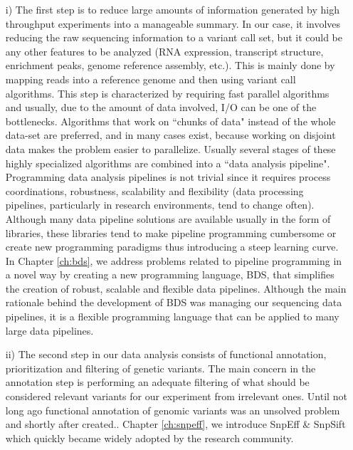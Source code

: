 \begin{itemize}
\item[i)] The first step is to reduce large amounts of information generated by high throughput experiments into a manageable summary. In our case, it involves reducing the raw sequencing information to a variant call set, but it could be any other features to be analyzed (RNA expression, transcript structure, enrichment peaks, genome reference assembly, etc.). This is mainly done by mapping reads into a reference genome and then using variant call algorithms. This step is characterized by requiring fast parallel algorithms and usually, due to the amount of data involved, I/O can be one of the bottlenecks. Algorithms that work on ``chunks of data" instead of the whole data-set are preferred, and in many cases exist, because working on disjoint data makes the problem easier to parallelize. Usually several stages of these highly specialized algorithms are combined into a ``data analysis pipeline". Programming data analysis pipelines is not trivial since it requires process coordinations, robustness, scalability and flexibility (data processing pipelines, particularly in research environments, tend to change often). Although many data pipeline solutions are available usually in the form of libraries, these libraries tend to make pipeline programming cumbersome or create new programming paradigms thus introducing a steep learning curve. In Chapter \ref{ch:bds}, we address problems related to pipeline programming in a novel way by creating a new programming language, BDS, that simplifies the creation of robust, scalable and flexible data pipelines. Although the main rationale behind the development of BDS was managing our sequencing data pipelines, it is a flexible programming language that can be applied to many large data pipelines.

\item[ii)] The second step in our data analysis consists of functional annotation, prioritization and filtering of genetic variants. The main concern in the annotation step is performing an adequate filtering of what should be considered relevant variants for our experiment from irrelevant ones. Until not long ago functional annotation of genomic variants was an unsolved problem and shortly after created..
Chapter \ref{ch:snpeff}, we introduce SnpEff \& SnpSift which quickly became widely adopted by the research community. 


\end{itemize}

